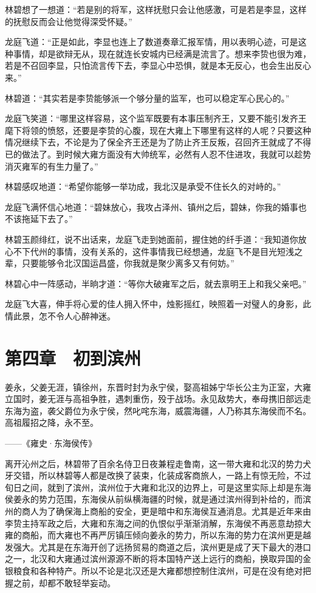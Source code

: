 林碧想了一想道：“若是别的将军，这样抚慰只会让他感激，可是若是李显，这样的抚慰反而会让他觉得深受怀疑。”

龙庭飞道：“正是如此，李显也连上了数道奏章汇报军情，用以表明心迹，可是这种事情，却是欲辩无从，现在就连长安城内已经满是流言了。想来李贽也很为难，若是不召回李显，只怕流言传下去，李显心中恐惧，就是本无反心，也会生出反心来。”

林碧道：“其实若是李贽能够派一个够分量的监军，也可以稳定军心民心的。”

龙庭飞笑道：“哪里这样容易，这个监军既要有本事压制齐王，又要不能引发齐王麾下将领的愤怒，还要是李贽的心腹，现在大雍上下哪里有这样的人呢？只要这种情况继续下去，不论是为了保全齐王还是为了防止齐王反叛，召回齐王就成了不得已的做法了。到时候大雍方面没有大帅统军，必然有人忍不住进攻，我就可以趁势消灭雍军的有生力量了。”

林碧感叹地道：“希望你能够一举功成，我北汉是承受不住长久的对峙的。”

龙庭飞满怀信心地道：“碧妹放心，我攻占泽州、镇州之后，碧妹，你我的婚事也不该拖延下去了。”

林碧玉颜绯红，说不出话来，龙庭飞走到她面前，握住她的纤手道：“我知道你放心不下代州的事情，没有关系的，这件事情我已经想通，龙庭飞不是目光短浅之辈，只要能够令北汉国运昌盛，你我就是聚少离多又有何妨。”

林碧心中一阵感动，半晌才道：“等你大破雍军之后，就去禀明王上和我父亲吧。”

龙庭飞大喜，伸手将心爱的佳人拥入怀中，烛影摇红，映照着一对璧人的身影，此情此景，怎不令人心醉神迷。

\chapter{第四章　初到滨州}

姜永，父姜无涯，镇徐州，东晋时封为永宁侯，娶高祖姊宁华长公主为正室，大雍立国时，姜无涯与高祖争胜，遇刺重伤，殁于战场。永见敌势大，奉母携旧部远走东海为盗，袭父爵位为永宁侯，然叱咤东海，威震海疆，人乃称其东海侯而不名。高祖履招之降，永不至。

——《雍史·东海侯传》

离开沁州之后，林碧带了百余名侍卫日夜兼程走鲁南，这一带大雍和北汉的势力犬牙交错，所以林碧等人都是改换了装束，化装成客商旅人，一路上有惊无险，不过旬日之间，就到了滨州，滨州位于大雍和北汉的边界上，可是这里实际上却是东海侯姜永的势力范围，东海侯从前纵横海疆的时候，就是通过滨州得到补给的，而滨州的商人为了确保海上商船的安全，更是暗中和东海侯互通消息。尤其是近年来由李贽主持军政之后，大雍和东海之间的仇恨似乎渐渐消解，东海侯不再恶意劫掠大雍的商船，而大雍也不再严厉镇压倾向姜永的势力，所以东海的势力在滨州更是越发强大。尤其是在东海开创了远扬贸易的商道之后，滨州更是成了天下最大的港口之一，北汉和大雍通过滨州源源不断的将本国特产送上远行的商船，换取异国的金银粮食和各种特产。所以不论是北汉还是大雍都想控制住滨州，可是在没有绝对把握之前，却都不敢轻举妄动。

